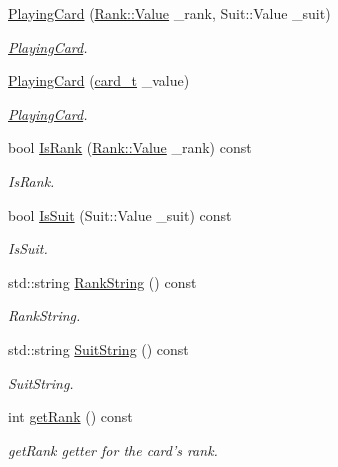 \begin{DoxyCompactItemize}
\item 
\hyperlink{classPlayingCard_a8de8d00a9b0c939e854f3e1eb0c76951}{Playing\-Card} (\hyperlink{namespaceRank_ac73ee8d855dc84f13c2d79ff5704e016}{Rank\-::\-Value} \-\_\-rank, Suit\-::\-Value \-\_\-suit)
\begin{DoxyCompactList}\small\item\em \hyperlink{classPlayingCard}{Playing\-Card}. \end{DoxyCompactList}\item 
\hyperlink{classPlayingCard_a8cd3272329a18aaff129090b747dc89b}{Playing\-Card} (\hyperlink{Dealer_8h_a1d862217db80f850f49ee1d961f93b59}{card\-\_\-t} \-\_\-value)
\begin{DoxyCompactList}\small\item\em \hyperlink{classPlayingCard}{Playing\-Card}. \end{DoxyCompactList}\item 
bool \hyperlink{classPlayingCard_abab3787e297f6d300fc1fabfa0d450c3}{Is\-Rank} (\hyperlink{namespaceRank_ac73ee8d855dc84f13c2d79ff5704e016}{Rank\-::\-Value} \-\_\-rank) const 
\begin{DoxyCompactList}\small\item\em Is\-Rank. \end{DoxyCompactList}\item 
bool \hyperlink{classPlayingCard_aa6a396991cc5fbd8633f7bc558feee15}{Is\-Suit} (Suit\-::\-Value \-\_\-suit) const 
\begin{DoxyCompactList}\small\item\em Is\-Suit. \end{DoxyCompactList}\item 
std\-::string \hyperlink{classPlayingCard_ad6db036ab4c9679c72168ebdb47a5af4}{Rank\-String} () const 
\begin{DoxyCompactList}\small\item\em Rank\-String. \end{DoxyCompactList}\item 
std\-::string \hyperlink{classPlayingCard_ad41bb59005104084b31401b54023b7e5}{Suit\-String} () const 
\begin{DoxyCompactList}\small\item\em Suit\-String. \end{DoxyCompactList}\item 
int \hyperlink{classPlayingCard_a1ef9f3301d355d11286f55baa7203119}{get\-Rank} () const 
\begin{DoxyCompactList}\small\item\em get\-Rank getter for the card's rank. \end{DoxyCompactList}\item 

\end{DoxyCompactItemize}
